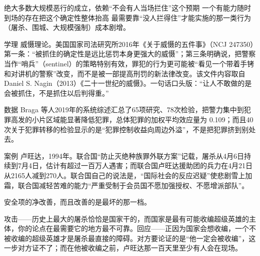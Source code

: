 \documentclass[prep,both]{debate}
\begin{document}
\begin{fields}
\begin{mechanism}[机制]
\step 绝大多数大规模恶行的成立，依赖“不会有人当场拦住”这个预期
\step 一个有能力随时到场的存在把这个确定性整体抬高
\step 最需要靠“没人拦得住”才能实施的那一类行为（屠杀、围城、大规模强制）成本剧增。

\end{mechanism}
\begin{evidence}{学理}
威慑理论。美国国家司法研究所2016年《关于威慑的五件事》（NCJ 247350）第一条：“被抓住的确定性是远比惩罚本身更强大的威慑”；第三条明确说，把警察当作“哨兵”（sentinel）的策略特别有效，罪犯的行为更可能被“看见一个带着手铐和对讲机的警察”改变，而不是被一部提高刑罚的新法律改变。该文件内容取自 Daniel S. Nagin（2013）《二十一世纪的威慑》。一句话口头版：“让人不敢做的是会被抓住，不是抓住以后判得重。”
\end{evidence}
\begin{evidence}{数据}
Braga 等人2019年的系统综述汇总了65项研究、78次检验，把警力集中到犯罪高发的小片区域能显著降低犯罪，总体犯罪的加权平均效应量为 0.109；而且40次关于犯罪转移的检验显示的是“犯罪控制收益向周边外溢”，不是把犯罪挤到别处去。
\end{evidence}
\begin{evidence}{案例}
卢旺达，1994年。联合国“防止灭绝种族罪外联方案”记载，屠杀从4月6日持续到7月4日，估计有超过一百万人遇害；而联合国卢旺达援助团的兵力在4月21日从2165人减到270人。联合国自己的说法是，“国际社会的反应迟疑”使悲剧雪上加霜，联合国减轻苦难的能力“严重受制于会员国不愿加强授权、不愿增派部队”。
\end{evidence}
\closing[回扣判准]{安全项的净改善，而且改善的是最坏的那一档。}
\begin{clash}
攻击——历史上最大的屠杀恰恰是国家干的，而国家是最有可能收编超级英雄的主体，你的论点在最需要它的地方最不可靠。回应——正因为国家会想收编，一个不被收编的超级英雄才是屠杀最直接的障碍。对方要论证的是“他一定会被收编”，这一步对方证不了；而在他被收编之前，卢旺达那一百天里至少有人会在现场。
\end{clash}
\end{fields}
\end{document}
